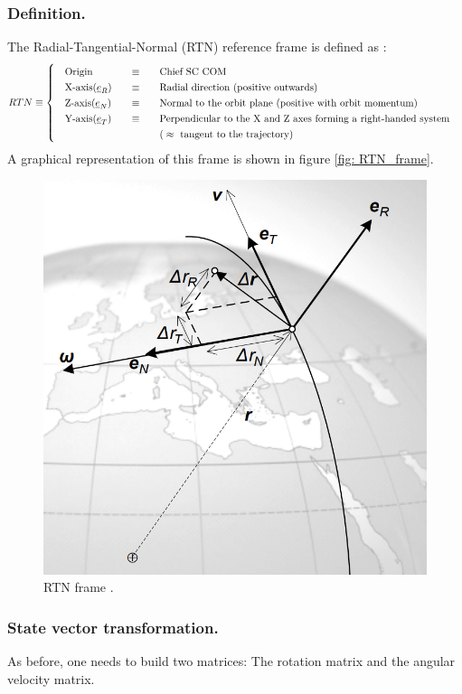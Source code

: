 		\subsubsection{Definition.}
		\indent The Radial-Tangential-Normal (RTN) reference frame is defined as \cite{dAmicoDLR}:
		\[
		\arraycolsep=10pt
		\def\arraystretch{1.3}
		RTN\equiv\left\{
		\begin{array}{lll}
		\text{Origin} 	& \equiv 	& \text{Chief SC COM} \\
		\text{X-axis}(\underline{e}_R) 	& \equiv 	& \text{Radial direction (positive outwards)} \\
		\text{Z-axis}(\underline{e}_N) 	& \equiv 	& \text{Normal to the orbit plane (positive with orbit momentum)} \\
		\text{Y-axis}(\underline{e}_T) 	& \equiv 	& \text{Perpendicular to the X and Z axes forming a right-handed system} \\
									 	& 			& \text{(} \approx \text{ tangent to the trajectory)}
		\end{array}
		\right.
		\]
		\indent A graphical representation of this frame is shown in figure \ref{fig:	RTN_frame}.
		\begin{figure}[!htb]
		\centering\includegraphics[width = 0.4\linewidth]{Appendices/Appendix_B/RTN_frame}
		\caption{RTN frame \cite{dAmicoDLR}.}
		\label{fig:	RTN_frame}
		\end{figure}
		\FloatBarrier
		\subsubsection{State vector transformation.}
		\indent As before, one needs to build two matrices: The rotation matrix and the angular velocity matrix. 
